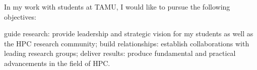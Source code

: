 \documentclass[12pt]{article}
\begin{document}
In my work with students at TAMU, I would like to pursue the following objectives:

guide research: provide leadership and strategic vision for my students as well as the HPC research community;
build relationships: establish collaborations with leading research groups;
deliver results: produce fundamental and practical advancements in the field of HPC.
\end{document}
